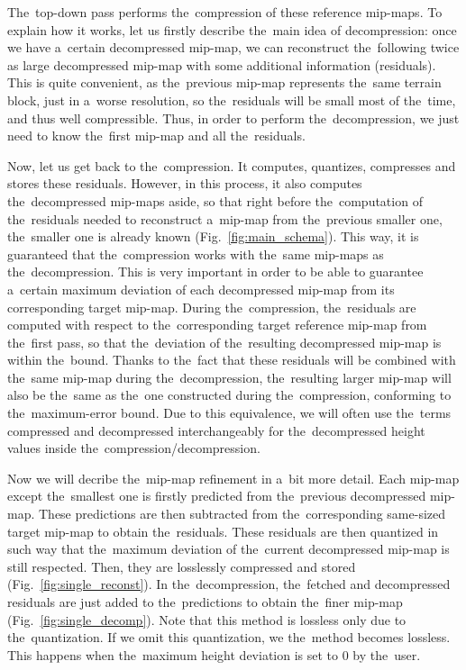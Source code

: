 The~top-down pass performs the~compression of these reference mip-maps. To explain how it works, let us firstly describe the~main idea of decompression: once we have a~certain decompressed mip-map, we can reconstruct the~following twice as large  decompressed mip-map with some additional information (residuals). This is quite convenient, as the~previous mip-map represents the~same terrain block, just in a~worse resolution, so the~residuals will be small most of the~time, and thus well compressible. Thus, in order to perform the~decompression, we just need to know the~first mip-map and all the~residuals. 

Now, let us get back to the~compression. It computes, quantizes, compresses and stores these residuals. However, in this process, it also computes the~decompressed mip-maps aside, so that right before the~computation of the~residuals needed to reconstruct a~mip-map from the~previous smaller one, the~smaller one is already known (Fig.~\ref{fig:main_schema}). This way, it is guaranteed that the~compression works with the~same mip-maps as the~decompression.  This is very important in order to be able to guarantee a~certain maximum deviation of each decompressed mip-map from its corresponding target mip-map. During the~compression, the~residuals are computed with respect to the~corresponding target reference mip-map from the~first pass, so that the~deviation of the~resulting decompressed mip-map is within the~bound. Thanks to the~fact that these residuals will be combined with the~same mip-map during the~decompression, the~resulting larger mip-map will also be the~same as the~one constructed during the~compression, conforming to the~maximum-error bound. Due to this equivalence, we will often use the~terms compressed and decompressed interchangeably for the~decompressed height values inside the~compression/decompression.

Now we will decribe the~mip-map refinement in a~bit more detail. Each mip-map except the~smallest one is firstly predicted from the~previous decompressed mip-map. These predictions are then subtracted from the~corresponding same-sized target mip-map to obtain the~residuals. These residuals are then quantized in such way that the~maximum deviation of the~current decompressed mip-map is still respected. Then, they are losslessly compressed and stored (Fig.~\ref{fig:single_reconst}). In the~decompression, the~fetched and decompressed residuals are just added to the~predictions to obtain the~finer mip-map (Fig.~\ref{fig:single_decomp}). Note that this method is lossless only due to the~quantization. If we omit this quantization, we the~method becomes lossless. This happens when the~maximum height deviation is set to 0 by the~user.

